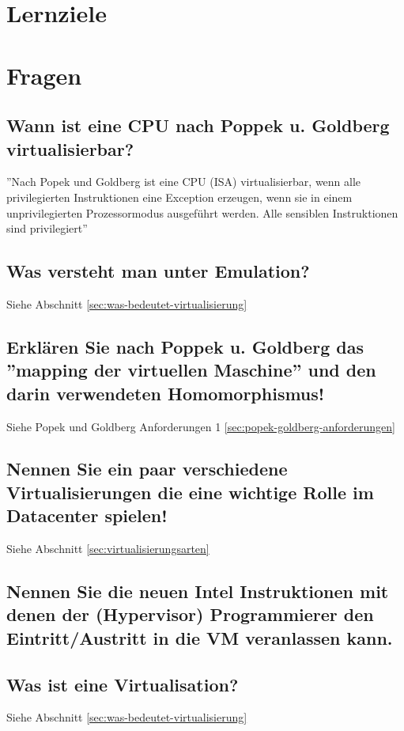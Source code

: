 \section{Lernziele}

\section{Fragen}
\subsection{Wann ist eine CPU nach Poppek u. Goldberg virtualisierbar?}
''Nach Popek und Goldberg ist eine CPU (ISA) virtualisierbar, wenn
alle privilegierten Instruktionen eine Exception erzeugen, wenn sie
in einem unprivilegierten Prozessormodus ausgeführt werden.
Alle sensiblen Instruktionen sind privilegiert''

\subsection{Was versteht man unter Emulation?}
Siehe Abschnitt \ref{sec:was-bedeutet-virtualisierung}

\subsection{Erklären Sie nach Poppek u. Goldberg das ''mapping der virtuellen Maschine'' und den darin verwendeten Homomorphismus!}
Siehe Popek und Goldberg Anforderungen 1 \ref{sec:popek-goldberg-anforderungen}

\subsection{Nennen Sie ein paar verschiedene Virtualisierungen die eine wichtige Rolle im Datacenter spielen!}
Siehe Abschnitt \ref{sec:virtualisierungsarten}

\subsection{Nennen Sie die neuen Intel Instruktionen mit denen der (Hypervisor) Programmierer den Eintritt/Austritt in die VM veranlassen kann.}

\subsection{Was ist eine Virtualisation?}
Siehe Abschnitt \ref{sec:was-bedeutet-virtualisierung}

